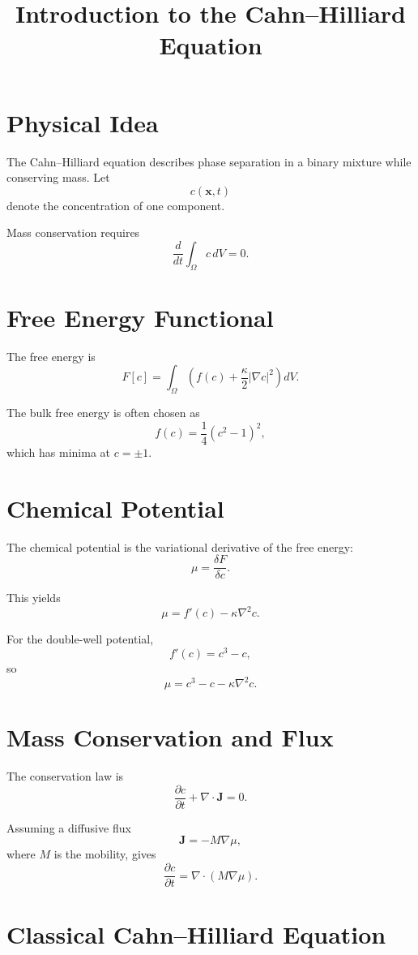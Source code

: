\documentclass[11pt]{article}
\title{Introduction to the Cahn--Hilliard Equation}
\date{}
\begin{document}
\maketitle

\section{Physical Idea}

The Cahn--Hilliard equation describes phase separation in a binary mixture while conserving mass.
Let
\[
c(\mathbf{x},t)
\]
denote the concentration of one component.

Mass conservation requires
\[
\frac{d}{dt}\int_\Omega c\,dV = 0.
\]

\section{Free Energy Functional}

The free energy is
\[
F[c]
=
\int_\Omega
\left(
f(c)
+
\frac{\kappa}{2}|\nabla c|^2
\right)
dV.
\]

The bulk free energy is often chosen as
\[
f(c)=\frac{1}{4}(c^2-1)^2,
\]
which has minima at \(c=\pm1\).

\section{Chemical Potential}

The chemical potential is the variational derivative of the free energy:
\[
\mu=\frac{\delta F}{\delta c}.
\]

This yields
\[
\mu=f'(c)-\kappa\nabla^2 c.
\]

For the double-well potential,
\[
f'(c)=c^3-c,
\]
so
\[
\mu=c^3-c-\kappa\nabla^2 c.
\]

\section{Mass Conservation and Flux}

The conservation law is
\[
\frac{\partial c}{\partial t}+\nabla\cdot\mathbf{J}=0.
\]

Assuming a diffusive flux
\[
\mathbf{J}=-M\nabla\mu,
\]
where \(M\) is the mobility, gives
\[
\frac{\partial c}{\partial t}
=
\nabla\cdot(M\nabla\mu).
\]

\section{Classical Cahn--Hilliard Equation}
\end{document}
